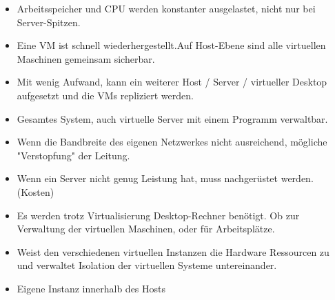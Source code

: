 \documentclass[10pt,a4paper,ragged2e]{altacv}
\begin{document}
\begin{paracol}{2}

\begin{itemize}
\item Arbeitsspeicher und CPU werden konstanter ausgelastet, nicht nur bei Server-Spitzen.
\item Eine VM ist schnell wiederhergestellt.\newline Auf Host-Ebene sind alle virtuellen Maschinen \newline gemeinsam sicherbar.
\item Mit wenig Aufwand, kann ein weiterer Host \newline / Server / virtueller Desktop aufgesetzt und die VMs repliziert werden.  
\item Gesamtes System, auch virtuelle Server mit einem Programm verwaltbar.

\end{itemize}

\vspace{3mm}

\begin{itemize}
\item Wenn die Bandbreite des eigenen Netzwerkes nicht ausreichend, mögliche "Verstopfung" der Leitung.
\item Wenn ein Server nicht genug Leistung hat, \newline muss nachgerüstet werden. (Kosten)
\item Es werden trotz Virtualisierung Desktop-Rechner benötigt. Ob zur Verwaltung der virtuellen Maschinen, oder für Arbeitsplätze.

\end{itemize}


\begin{itemize}
\item Weist den verschiedenen virtuellen Instanzen die Hardware Ressourcen zu und verwaltet Isolation der virtuellen Systeme untereinander.
\end{itemize}

\vspace{3mm}

\begin{itemize}
    \item Eigene Instanz innerhalb des Hosts 
\end{itemize}


\end{paracol}
\end{document}
